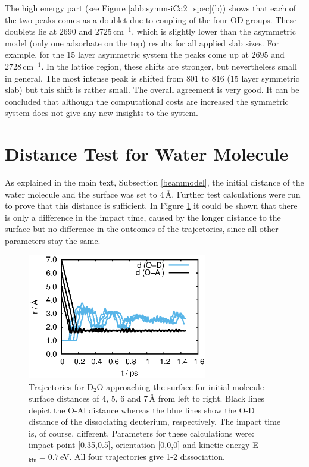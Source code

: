 \documentclass[11pt,DIV=13,BCOR=5mm,a4paper,headinclude]{scrbook}
\begin{document}
The high energy part (see Figure \ref{abb:symm-iCa2_spec}(b)) shows that each of the two peaks comes as a doublet due to coupling of the four OD groups. %
These doublets lie at $2690$ and $2725\,$cm$^{-1}$, which is slightly lower than the asymmetric model (only one adsorbate on the top) results for all applied slab sizes.
For example, for the 15 layer asymmetric system the peaks come up at $2695$ and $2728\,$cm$^{-1}$.
In the lattice region, these shifts are stronger, but nevertheless small in general.
The most intense peak is shifted from $801$ to $816$ (15 layer symmetric slab) but this shift is rather small.
The overall agreement is very good.
It can be concluded that although the computational costs are increased the symmetric system does not give any new insights to the system.
\\
\def\thefigure{C.\arabic{figure}}
\def\thetable{C.\arabic{table}}
\section{Distance Test for Water Molecule}\label{sec:disttest}
As explained in the main text, Subsection \ref{beammodel}, the initial distance of the water molecule and the surface was set to $4\,$\AA{}.
Further test calculations were run to prove that this distance is sufficient.
In Figure \ref{abb:MBS-dist} it could be shown that there is only a difference in the impact time, caused by the longer distance to the surface but no difference in the outcomes of the trajectories, since all other parameters stay the same.
 \begin{figure}[!h]
    \centering
    \includegraphics[width=0.7\textwidth]{figures/11-20/MD_all.eps}
  \caption{Trajectories for D$_2$O approaching the surface for initial molecule-surface distances of $4$, $5$, $6$ and $7\,$\AA{} from left to right.
Black lines depict the O-Al distance whereas the blue lines show the O-D distance of the dissociating deuterium, respectively.
The impact time is, of course, different.
Parameters for these calculations were: impact point [0.35,0.5], orientation [0,0,0] and kinetic energy E$_\textrm{kin}=0.7\,$eV.
All four trajectories give 1-2 dissociation.}
  \label{abb:MBS-dist}
 \end{figure}
\\
\def\thefigure{D.\arabic{figure}}
\def\thetable{D.\arabic{table}}
\end{document}
